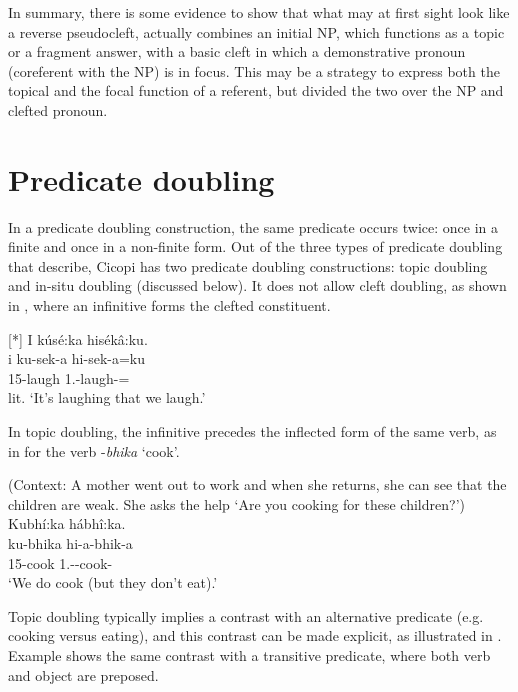 \documentclass[output=paper]{langscibook}
\begin{document}
\z

In summary, there is some evidence to show that what may at first sight look like a reverse pseudocleft, actually combines an initial NP, which functions as a topic or a fragment answer, with a basic cleft in which a demonstrative pronoun (coreferent with the NP) is in focus. This may be a strategy to express both the topical and the focal function of a referent, but divided the two over the NP and clefted pronoun.

\section{Predicate doubling}
\label{bkm:Ref141344221}
In a predicate doubling construction, the same predicate occurs twice: once in a finite and once in a non-finite form. Out of the three types of predicate doubling that \citet{GüldemannFiedler2022} describe, Cicopi has two predicate doubling constructions: topic doubling and in-situ doubling (discussed below). It does not allow cleft doubling, as shown in , where an infinitive forms the clefted constituent.

\ea
[*]{
\label{bkm:Ref120698959}
I kúsé:ka hisékâ:ku.\\
\gll
i  ku-sek-a  hi-sek-a=ku\\
\COP{}  15-laugh  1\PL.\SM{}-laugh-\FV{}=\REL{}\\
\glt
lit. ‘It’s laughing that we laugh.’\\
}

\z

In topic doubling, the infinitive precedes the inflected form of the same verb, as in  for the verb \nobreakdash-\textit{bhika} ‘cook’.

\ea
\label{bkm:Ref121154546}
(Context: A mother went out to work and when she returns, she can see that the children are weak. She asks the help ‘Are you cooking for these children?’)\\
Kubhí:ka hábhî:ka.\\
\gll
ku-bhika  hi-a-bhik-a\\
15-cook  1\PL.\SM-\DJ{}-cook-\FV{}\\
\glt
‘We do cook (but they don’t eat).’\\

\z

Topic doubling typically implies a contrast with an alternative predicate (e.g. cooking versus eating), and this contrast can be made explicit, as illustrated in . Example  shows the same contrast with a transitive predicate, where both verb and object are preposed.
\pagebreak
\end{document}
